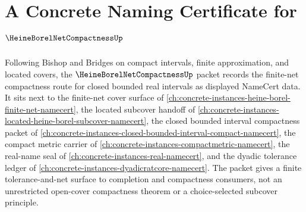 \chapter{A Concrete Naming Certificate for $\HeineBorelNetCompactnessUp$}
\label{ch:concrete-instances-heine-borel-net-compactness-namecert}

Following Bishop and Bridges on compact intervals, finite approximation, and located covers, the $\HeineBorelNetCompactnessUp$ packet records the finite-net compactness route for closed bounded real intervals as displayed NameCert data. It sits next to the finite-net cover surface of \autoref{ch:concrete-instances-heine-borel-finite-net-namecert}, the located subcover handoff of \autoref{ch:concrete-instances-located-heine-borel-subcover-namecert}, the closed bounded interval compactness packet of \autoref{ch:concrete-instances-closed-bounded-interval-compact-namecert}, the compact metric carrier of \autoref{ch:concrete-instances-compactmetric-namecert}, the real-name seal of \autoref{ch:concrete-instances-real-namecert}, and the dyadic tolerance ledger of \autoref{ch:concrete-instances-dyadicratcore-namecert}. The packet gives a finite tolerance-and-net surface to completion and compactness consumers, not an unrestricted open-cover compactness theorem or a choice-selected subcover principle.

